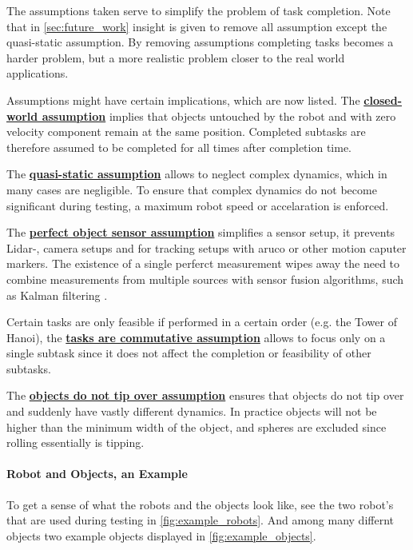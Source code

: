 The assumptions taken serve to simplify the problem of task completion. Note that in \cref{sec:future_work} insight is given to remove all assumption except the quasi-static assumption. By removing assumptions completing tasks becomes a harder problem, but a more realistic problem closer to the real world applications.\bs

Assumptions might have certain implications, which are now listed. The \hyperref[assumption:closed_world]{\textbf{closed-world assumption}} implies that objects untouched by the robot and with zero velocity component remain at the same position. Completed subtasks are therefore assumed to be completed for all times after completion time.\bs

The \hyperref[assumption:quasi_static]{\textbf{quasi-static assumption}} allows to neglect complex dynamics, which in many cases are negligible. To ensure that complex dynamics do not become significant during testing, a maximum robot speed or accelaration is enforced.\bs

The \hyperref[assumption:perfect_object_sensor]{\textbf{perfect object sensor assumption}} simplifies a sensor setup, it prevents Lidar-, camera setups and for tracking setups with aruco or other motion caputer markers. The existence of a single perferct measurement wipes away the need to combine measurements from multiple sources with sensor fusion algorithms, such as Kalman filtering \cite{verhaegen_filtering_2007}.\bs

Certain tasks are only feasible if performed in a certain order (e.g. the Tower of Hanoi), the \hyperref[assumption:order_does_not_matter]{\textbf{tasks are commutative assumption}} allows to focus only on a single subtask since it does not affect the completion or feasibility of other subtasks.\bs

The \hyperref[assumption:no_tipping]{\textbf{objects do not tip over assumption}} ensures that objects do not tip over and suddenly have vastly different dynamics. In practice objects will not be higher than the minimum width of the object, and spheres are excluded since rolling essentially is tipping. 

\paragraph{Robot and Objects, an Example}
To get a sense of what the robots and the objects look like, see the two robot's that are used during testing in \cref{fig:example_robots}. And among many differnt objects two example objects displayed in \cref{fig:example_objects}.

